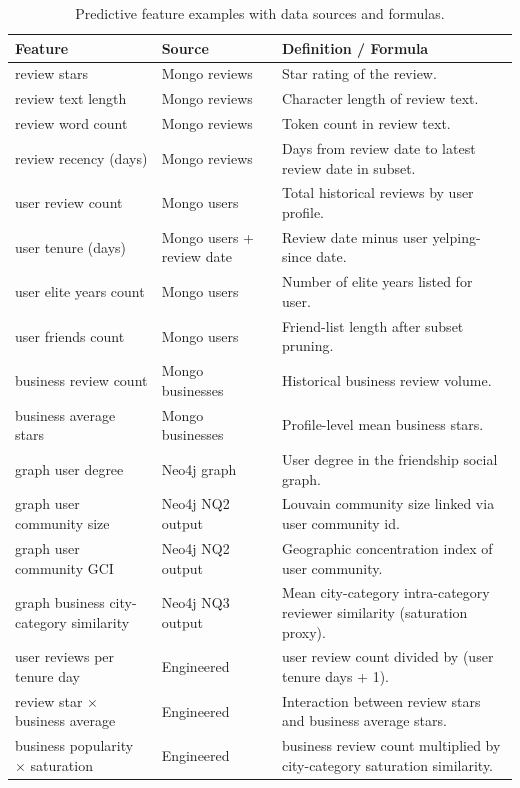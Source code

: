 \documentclass[11pt,a4paper]{article}
\begin{document}
\begin{table}[H]
\centering
\small
\begin{tabularx}{\textwidth}{l l X}
\toprule
\textbf{Feature} & \textbf{Source} & \textbf{Definition / Formula} \\
\midrule
review stars & Mongo reviews & Star rating of the review. \\
review text length & Mongo reviews & Character length of review text. \\
review word count & Mongo reviews & Token count in review text. \\
review recency (days) & Mongo reviews & Days from review date to latest review date in subset. \\
user review count & Mongo users & Total historical reviews by user profile. \\
user tenure (days) & Mongo users + review date & Review date minus user yelping-since date. \\
user elite years count & Mongo users & Number of elite years listed for user. \\
user friends count & Mongo users & Friend-list length after subset pruning. \\
business review count & Mongo businesses & Historical business review volume. \\
business average stars & Mongo businesses & Profile-level mean business stars. \\
graph user degree & Neo4j graph & User degree in the friendship social graph. \\
graph user community size & Neo4j NQ2 output & Louvain community size linked via user community id. \\
graph user community GCI & Neo4j NQ2 output & Geographic concentration index of user community. \\
graph business city-category similarity & Neo4j NQ3 output & Mean city-category intra-category reviewer similarity (saturation proxy). \\
user reviews per tenure day & Engineered & user review count divided by (user tenure days + 1). \\
review star $\times$ business average & Engineered & Interaction between review stars and business average stars. \\
business popularity $\times$ saturation & Engineered & business review count multiplied by city-category saturation similarity. \\
\bottomrule
\end{tabularx}
\caption{Predictive feature examples with data sources and formulas.}
\end{table}
\end{document}
